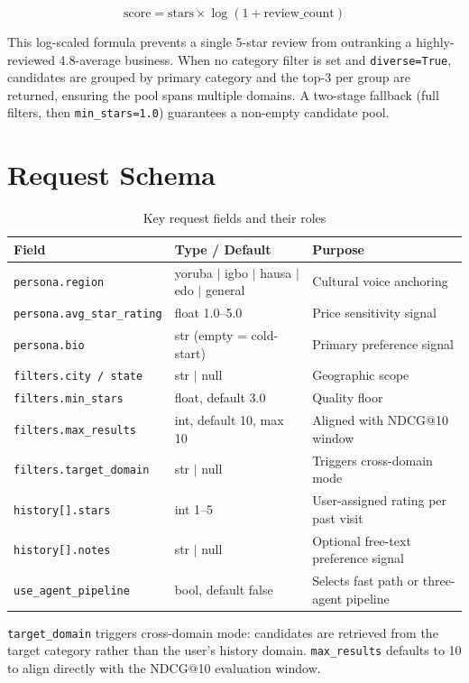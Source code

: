 \documentclass[11pt]{article}
\begin{document}
$$\text{score} = \text{stars} \times \log(1 + \text{review\_count})$$

This log-scaled formula prevents a single 5-star review from outranking a highly-reviewed 4.8-average business. When no category filter is set and \texttt{diverse=True}, candidates are grouped by primary category and the top-3 per group are returned, ensuring the pool spans multiple domains. A two-stage fallback (full filters, then \texttt{min\_stars=1.0}) guarantees a non-empty candidate pool.

\section{Request Schema}

\begin{table}[h]
\centering
\begin{tabularx}{\textwidth}{llX}
\toprule
\textbf{Field} & \textbf{Type / Default} & \textbf{Purpose} \\
\midrule
\texttt{persona.region} & yoruba $|$ igbo $|$ hausa $|$ edo $|$ general & Cultural voice anchoring \\
\texttt{persona.avg\_star\_rating} & float 1.0–5.0 & Price sensitivity signal \\
\texttt{persona.bio} & str (empty = cold-start) & Primary preference signal \\
\texttt{filters.city / state} & str $|$ null & Geographic scope \\
\texttt{filters.min\_stars} & float, default 3.0 & Quality floor \\
\texttt{filters.max\_results} & int, default 10, max 10 & Aligned with NDCG@10 window \\
\texttt{filters.target\_domain} & str $|$ null & Triggers cross-domain mode \\
\texttt{history[].stars} & int 1–5 & User-assigned rating per past visit \\
\texttt{history[].notes} & str $|$ null & Optional free-text preference signal \\
\texttt{use\_agent\_pipeline} & bool, default false & Selects fast path or three-agent pipeline \\
\bottomrule
\end{tabularx}
\caption{Key request fields and their roles}
\end{table}

\texttt{target\_domain} triggers cross-domain mode: candidates are retrieved from the target category rather than the user's history domain. \texttt{max\_results} defaults to 10 to align directly with the NDCG@10 evaluation window.
\end{document}
